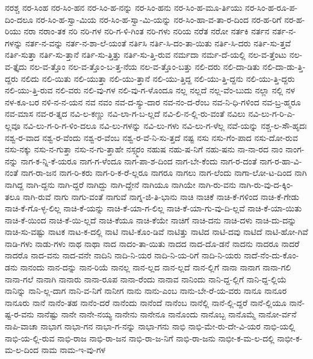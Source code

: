 {ನರಶ್ಚ
ನರ-ಸಿಂಹ
ನರ-ಸಿಂ-ಹನ
ನರ-ಸಿಂ-ಹ-ನನ್ನು
ನರ-ಸಿಂ-ಹನು
ನರ-ಸಿಂ-ಹ-ಮೂ-ರ್ತಿಯು
ನರ-ಸಿಂ-ಹ-ರೂ-ಪ-ದಿಂ-ದಲೂ
ನರ-ಸಿಂ-ಹ-ಸ್ವಾ-ಮಿಯ
ನರ-ಸಿಂ-ಹ-ಸ್ವಾ-ಮಿ-ಯನ್ನು
ನರ-ಸಿಂ-ಹಾ-ವ-ತಾ-ರ-ದಿಂದ
ನರ-ಹ-ರಿಗೆ
ನರ-ಹ-ರಿಯು
ನರಾ
ನರಾಂ-ತಕ
ನರಿ
ನರಿ-ಗಳ
ನರಿ-ಗ-ಳಿ-ಗಿಂತ
ನರಿ-ಗಳು
ನರಿಯ
ನರೆತ
ನರೋ
ನರ್ತಕಿ
ನರ್ತನ
ನರ್ತ-ನ-ಗಳನ್ನು
ನರ್ತ-ನ-ವನ್ನು
ನರ್ತ-ನ-ಶಾ-ಲೆ-ಯಂತೆ
ನರ್ತಿಸಿ
ನರ್ತಿ-ಸಿ-ದಂ-ತಾ-ಯಿತು
ನರ್ತಿ-ಸಿ-ದರು
ನರ್ತಿ-ಸು-ತ್ತವೆ
ನರ್ತಿ-ಸುತ್ತಾ
ನರ್ತಿ-ಸು-ತ್ತಾನೆ
ನರ್ತಿ-ಸು-ತ್ತಿತ್ತು
ನರ್ತಿ-ಸು-ತ್ತಿ-ರುವ
ನರ್ಮದಾ
ನರ್ಮ-ದೆ-ಯಲ್ಲಿ
ನಲ-ವ-ತ್ತೆಂಟು
ನಲ-ವ-ತ್ತೈದು
ನಲ-ವ-ತ್ತೊಂ
ನಲ-ವ-ತ್ತೊಂ-ಬ-ತ್ತ-ನೆಯ
ನಲ-ವ-ತ್ತೊಂ-ಬತ್ತು
ನಲಿ-ದರು
ನಲಿ-ದಾ-ಡಿತು
ನಲಿ-ದಾ-ಡು-ತ್ತಿ-ದ್ದರು
ನಲಿದು
ನಲಿ-ಯಿತು
ನಲಿ-ಯುತ್ತಾ
ನಲಿ-ಯು-ತ್ತಾನೆ
ನಲಿ-ಯು-ತ್ತಿದ್ದ
ನಲಿ-ಯು-ತ್ತಿ-ದ್ದನು
ನಲಿ-ಯು-ತ್ತಿ-ದ್ದರು
ನಲಿ-ಯು-ತ್ತಿ-ರುವ
ನಲಿ-ವರು
ನಲಿ-ವು-ಗಳ
ನಲಿ-ವು-ಗ-ಳೊಂದೂ
ನಲ್ಲ
ನಲ್ಲದೆ
ನಲ್ಲ-ವೆಂ-ಬುದು
ನಲ್ಲಾ
ನಲ್ಲಿ
ನಳ
ನಳ-ಕೂ-ಬರ
ನಳಿ-ನ-ನ-ಯನ
ನವ
ನವಂ
ನವ-ದ-ಸ್ಯು-ದಾರ
ನವ-ನಂ-ದ-ರೆಂಬ
ನವ-ನಿ-ಧಿ-ಗಳಿಂದ
ನವ-ಬ್ರ-ಹ್ಮರೂ
ನವ-ಮಾಸ
ನವ-ರ-ತ್ನದ
ನವಿ-ಲ-ಕಣ್ಣು
ನವಿ-ಲಾ-ಗ-ಬ-ಲ್ಲದೆ
ನವಿ-ಲಿ-ನ-ಲ್ಲಿ-ರು-ವಂತೆ
ನವಿಲು
ನವಿ-ಲು-ಗ-ರಿ-ಎ-ಲ್ಲವೂ
ನವಿ-ಲು-ಗ-ರಿ-ಗ-ಳಿಂ-ದಲೂ
ನವಿ-ಲು-ಗಳನ್ನು
ನವಿ-ಲು-ಗಳು
ನವಿ-ಲು-ಗ-ಳೆಲ್ಲ
ನವೆ-ಯನ್ನು
ನಶ್ಚ-ಲ-ಸೌ-ಹೃದಃ
ನಶ್ವ-ರ-ವಾದ
ನಶ್ವ-ರ-ವೆಂದು
ನಶ್ವ-ರ-ವೆಂಬ
ನಶ್ವ-ರ-ವೆ-ನಿ-ಸು-ತ್ತದೆ
ನಷ್ಟ
ನಸು
ನಸು-ಗೆಂ-ಪಾದ
ನಸು-ದೋ-ರುವ
ನಸು-ನಕ್ಕು
ನಸು-ನ-ಗುತ್ತಾ
ನಸು-ನ-ಗು-ತ್ತಾಹೇ
ನಸ್ಸ್ಮರಂ
ನಹುಷ
ನಹು-ಷ-ನಿಗೆ
ನಹು-ಷನು
ನಾ-ನಾ-ರದ
ನಾಂ
ನಾಂಗ-ನನ್ನು
ನಾಗ-ಕ-ನ್ನಿ-ಕೆ-ಯರೂ
ನಾಗ-ಗ-ಳೆಂದೂ
ನಾಗ-ಪಾ-ಶ-ದಿಂದ
ನಾಗ-ಬೇ-ಕೆಂದು
ನಾಗ-ರ-ದಂತೆ
ನಾಗ-ರ-ಹಾ-ವಿ-ನಂತೆ
ನಾಗ-ರಾ-ಜನ
ನಾಗ-ರಿ-ಕರು
ನಾಗ-ರಿ-ಕ-ರೆ-ಲ್ಲರೂ
ನಾಗರೂ
ನಾಗಲು
ನಾಗ-ಲೆಂದು
ನಾಗಾ-ಲೋ-ಟ-ದಿಂದ
ನಾಗಿ
ನಾಗಿದ್ದ
ನಾಗಿ-ದ್ದನು
ನಾಗಿ-ದ್ದರೆ
ನಾಗಿದ್ದು
ನಾಗಿ-ದ್ದೇನೆ
ನಾಗಿಯೂ
ನಾಗಿಯೇ
ನಾಗಿ-ರು-ವನು
ನಾಗಿ-ರು-ವು-ದ-ಕ್ಕಿಂ-ತಲೂ
ನಾಗಿ-ರುವೆ
ನಾಗು
ನಾಗು-ವಂತೆ
ನಾಗುವೆ
ನಾಗ್ನ-ಜಿ-ತಿ-ಭಾನು
ನಾಚಿ
ನಾಚಿಕೆ
ನಾಚಿ-ಕೆ-ಗಳಿಂದ
ನಾಚಿ-ಕೆ-ಗೇಡು
ನಾಚಿ-ಕೆ-ಗೊ-ಳ್ಳ-ಲಿಲ್ಲ
ನಾಚಿ-ಕೆ-ಯನ್ನು
ನಾಚಿ-ಕೆ-ಯಾ-ಗ-ಲಿಲ್ಲ
ನಾಚಿ-ಕೆ-ಯಾ-ಗು-ವು-ದಿ-ಲ್ಲವೆ
ನಾಚಿ-ಕೆ-ಯಾ-ಯಿತು
ನಾಚಿ-ಕೆ-ಯಿಂದ
ನಾಚಿ-ಕೆ-ಯಿ-ಲ್ಲದೆ
ನಾಚಿ-ಕೆಯೂ
ನಾಚಿ-ಕೆಯೇ
ನಾಚಿಗೆ
ನಾಚಿ-ದನು
ನಾಚಿ-ದಳು
ನಾಚಿ-ದು-ದನ್ನು
ನಾಚಿ-ಸು-ವಷ್ಟು
ನಾಟಕ
ನಾಟ-ಕ-ದಲ್ಲಿ
ನಾಟಿ
ನಾಟಿ-ಕೊಂ-ಡಿವೆ
ನಾಟಿತ್ತು
ನಾಟಿದ
ನಾಟಿ-ದವು
ನಾಟಿದೆ
ನಾಟಿ-ಹೋ-ಗಿವೆ
ನಾಡಿ-ಗಳು
ನಾಡು-ಗಳು
ನಾಥ
ನಾಥಾ
ನಾದ
ನಾದಂ-ತಾ-ಯಿತು
ನಾದದ
ನಾದ-ದೊ-ಡನೆ
ನಾದನು
ನಾದರೂ
ನಾದರೆ
ನಾದರೊ
ನಾದ-ವನು
ನಾದ-ವನೇ
ನಾದಿನಿ
ನಾದಿ-ನಿ-ಯರ
ನಾದಿ-ನಿ-ಯ-ರಿಗೆ
ನಾದಿ-ನಿ-ಯರು
ನಾದೆ-ನೆಂ-ದು-ಕೊಂ-ಡನು
ನಾನಂದು
ನಾನ-ದನ್ನು
ನಾನ-ರಿಯೆ
ನಾನಲ್ಲ
ನಾನ-ಲ್ಲದ
ನಾನ-ಲ್ಲದೆ
ನಾನ-ಲ್ಲಿಗೆ
ನಾನಾ
ನಾನಾಗ
ನಾನಾ-ಗಲಿ
ನಾನಾ-ಗಲೆ
ನಾನಾಗಿ
ನಾನಾರು
ನಾನಾ-ರೂಪ
ನಾನಾ-ರೆಂದು
ನಾನಾವ
ನಾನಿಂದು
ನಾನಿ-ದ್ದ-ಲ್ಲಿಗೆ
ನಾನಿ-ದ್ದ-ಲ್ಲಿಯೆ
ನಾನಿನ್ನು
ನಾನಿ-ಲ್ಲ-ದಾಗ
ನಾನಿ-ವ-ನಿಗೆ
ನಾನೀಗ
ನಾನು
ನಾನು-ಎಂಬ
ನಾನು-ಬೇ-ರೆ-ಯ-ವರು
ನಾನೂ
ನಾನೂರ
ನಾನೂರು
ನಾನೆ
ನಾನೆಂ-ತಹ
ನಾನೆಂ-ದರೆ
ನಾನೆಂದು
ನಾನೆಂದೆ
ನಾನೆಂಬ
ನಾನೆಲ್ಲಿ
ನಾನೆ-ಲ್ಲಿ-ದ್ದರೆ
ನಾನೆ-ಲ್ಲಿಯೂ
ನಾನೆ-ಷ್ಟ-ರ-ವನು
ನಾನೆಷ್ಟು
ನಾನೇ
ನಾನೇ-ನಯ್ಯ
ನಾನೇನು
ನಾನೇನೂ
ನಾನೊಂದು
ನಾನೊಬ್ಬ
ನಾನೊಮ್ಮೆ
ನಾನೋ-ರ್ವನೆ
ನಾಪಿ-ವಾಚಾ
ನಾಭಾಗ
ನಾಭಾ-ಗನ
ನಾಭಾ-ಗ-ನನ್ನು
ನಾಭಾ-ಗನು
ನಾಭಿ
ನಾಭಿ-ಮೇ-ರು-ದೇ-ವಿ-ಯರ
ನಾಭಿ-ಯಲ್ಲಿ
ನಾಭಿ-ಯ-ಲ್ಲಿ-ರುವ
ನಾಭಿ-ರಾಜ
ನಾಭಿ-ರಾ-ಜನ
ನಾಭಿ-ರಾ-ಜ-ನಿಗೆ
ನಾಭಿ-ರಾ-ಜನು
ನಾಭೀ-ಕ-ಮ-ಲ-ದಲ್ಲಿ
ನಾಭೀ-ಕ-ಮ-ಲ-ದಿಂದ
ನಾಮ
ನಾಮ-ಇ-ವು-ಗಳ
}
